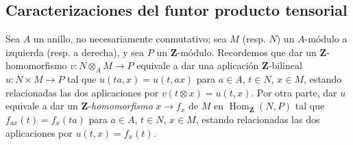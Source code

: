 \subsection{Caracterizaciones del funtor producto tensorial}
\label{subsection:III.7.2}
\label{subsection:III.7.2.fr}

\begin{env}[7.2.1]
\label{III.7.2.1}
Sea $A$ un anillo, no necesariamente conmutativo; sea $M$
(resp. $N$) un $A$-módulo a izquierda
(resp. a derecha), y sea $P$ un $\mathbf Z$-módulo.
Recordemos que dar un $\mathbf Z$-homomorfismo
$v:N\otimes_A M\longrightarrow P$
equivale a dar una aplicación $\mathbf Z$-bilineal
$u:N\times M\longrightarrow P$
tal que $u(ta,x)=u(t,ax)$ para $a\in A$, $t\in N$, $x\in M$,
estando relacionadas las dos aplicaciones por $v(t\otimes x)=u(t,x)$.
Por otra parte, dar $u$ equivale a dar un
$\mathbf Z$-\emph{homomorfismo}
$x\to f_x$
de $M$ en $\operatorname{Hom}_{\mathbf Z}(N,P)$ tal que
$f_{ax}(t)=f_x(ta)$ para $a\in A$, $t\in N$, $x\in M$,
estando relacionadas las dos aplicaciones por $u(t,x)=f_x(t)$.
\end{env}

